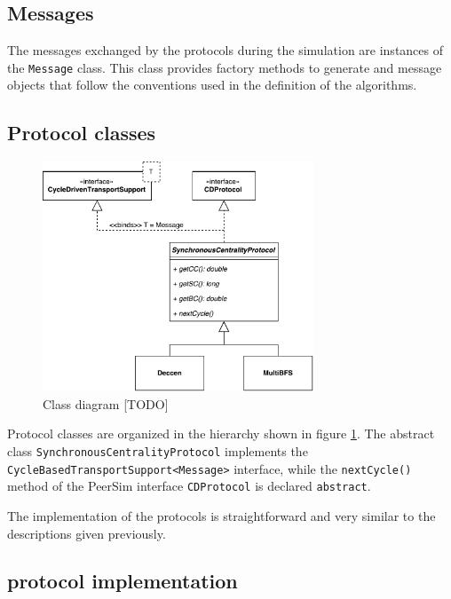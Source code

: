 \subsection*{Messages}
The messages exchanged by the protocols during the simulation are instances of the \texttt{Message} class. This class provides factory methods to generate \mdisc{} and \mrep{} message objects that follow the conventions used in the definition of the algorithms. 

\subsection*{Protocol classes}

\begin{figure}
\centering
\includegraphics[width=0.72\textwidth]{diagram.pdf}
\caption{Class diagram [TODO]}
\label{class:protocol:hierarchy}
\end{figure}

Protocol classes are organized in the hierarchy shown in figure \ref{class:protocol:hierarchy}. The abstract class \texttt{SynchronousCentralityProtocol} implements the \texttt{Cycle\allowbreak Based\-Transport\-Support<Message>}  interface, while the \texttt{nextCycle()} method of the PeerSim interface \texttt{CDProtocol} is declared \texttt{abstract}.

The implementation of the protocols is straightforward and very similar to the descriptions given previously.

\subsection*{\deccen{} protocol implementation}

